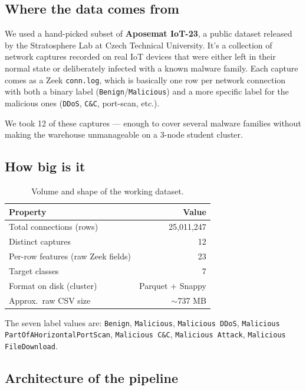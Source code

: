 \documentclass[11pt,a4paper]{article}
\begin{document}
\subsection{Where the data comes from}

We used a hand-picked subset of \textbf{Aposemat IoT-23}, a public dataset
released by the Stratosphere Lab at Czech Technical University. It's a
collection of network captures recorded on real IoT devices that were
either left in their normal state or deliberately infected with a known
malware family. Each capture comes as a Zeek \texttt{conn.log}, which is
basically one row per network connection with both a binary label
(\texttt{Benign}/\texttt{Malicious}) and a more specific label for the
malicious ones (\texttt{DDoS}, \texttt{C\&C}, port-scan, etc.).

We took 12 of these captures --- enough to cover several malware families
without making the warehouse unmanageable on a 3-node student cluster.

\subsection{How big is it}

\begin{table}[H]
\centering
\small
\begin{tabular}{lr}
\toprule
\textbf{Property} & \textbf{Value} \\
\midrule
Total connections (rows) & 25{,}011{,}247 \\
Distinct captures & 12 \\
Per-row features (raw Zeek fields) & 23 \\
Target classes & 7 \\
Format on disk (cluster) & Parquet + Snappy \\
Approx.\ raw CSV size & $\sim$737 MB \\
\bottomrule
\end{tabular}
\caption{Volume and shape of the working dataset.}
\end{table}

The seven label values are: \texttt{Benign}, \texttt{Malicious},
\texttt{Malicious DDoS}, \texttt{Malicious PartOfAHorizontalPortScan},
\texttt{Malicious C\&C}, \texttt{Malicious Attack},
\texttt{Malicious FileDownload}.

\subsection{Architecture of the pipeline}
\end{document}
